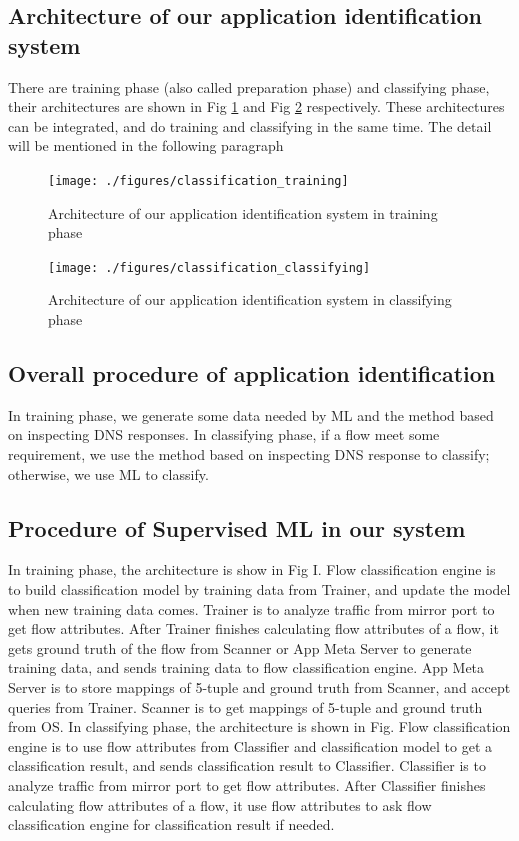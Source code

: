 \documentclass[journal]{IEEEtran}
\begin{document}
\subsection{Architecture of our application identification system}
There are training phase (also called preparation phase) and classifying phase, their architectures are shown in Fig \ref{fig:classifcation_training} and Fig \ref{fig:classifcation_classifying} respectively. These architectures can be integrated, and do training and classifying in the same time. The detail will be mentioned in the following paragraph

\begin{figure}[!t]
\centering
\texttt{[image: ./figures/classification\_training]}
\caption{Architecture of our application identification system in training phase}
\label{fig:classifcation_training}
\end{figure}

\begin{figure}[!t]
\centering
\texttt{[image: ./figures/classification\_classifying]}
\caption{Architecture of our application identification system in classifying phase}
\label{fig:classifcation_classifying}
\end{figure}

\subsection{Overall procedure of application identification}
In training phase, we generate some data needed by ML and the method based on inspecting DNS responses. In classifying phase, if a flow meet some requirement, we use the method based on inspecting DNS response to classify; otherwise, we use ML to classify.

\subsection{Procedure of Supervised ML in our system}
In training phase, the architecture is show in Fig I. Flow classification engine is to build classification model by training data from Trainer, and update the model when new training data comes. Trainer is to analyze traffic from mirror port to get flow attributes. After Trainer finishes calculating flow attributes of a flow, it gets ground truth of the flow from Scanner or App Meta Server to generate training data, and sends training data to flow classification engine. App Meta Server is to store mappings of 5-tuple and ground truth from Scanner, and accept queries from Trainer. Scanner is to get mappings of 5-tuple and ground truth from OS.
In classifying phase, the architecture is shown in Fig. Flow classification engine is to use flow attributes from Classifier and classification model to get a classification result, and sends classification result to Classifier. Classifier is to analyze traffic from mirror port to get flow attributes. After Classifier finishes calculating flow attributes of a flow, it use flow attributes to ask flow classification engine for classification result if needed.
\end{document}
